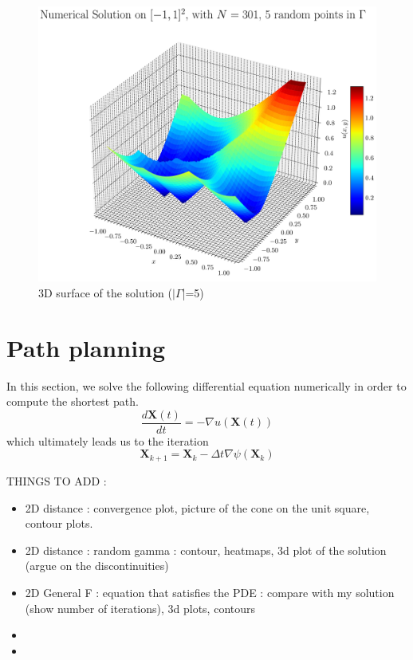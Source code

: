 \documentclass[11pt]{article}
\theoremstyle{definition}
\theoremstyle{remark}
\begin{document}
\begin{figure}[h]
\begin{minipage}{0.45\textwidth}
    \includegraphics[width=\linewidth]{plots/solution_3d_surface_random5.png}
    \caption{3D surface of the solution ($|\Gamma$|=5)}
    \label{fig:surface5}
  \end{minipage}
\end{figure}


\newpage
\newpage
\section{Path planning}
In this section, we solve the following differential equation numerically in order to compute the shortest path.
\begin{equation}
    \frac{d\textbf{X}(t)}{dt}=-\nabla u(\textbf{X}(t))
\end{equation}
which ultimately leads us to the iteration 
\begin{equation}
    \textbf{X}_{k+1}=\textbf{X}_k-\Delta t \nabla \psi(\textbf{X}_k)
\end{equation}

THINGS TO ADD :
\begin{itemize}
    \item 2D distance : convergence plot, picture of the cone on the unit square, contour plots.
    \item 2D distance : random gamma : contour, heatmaps, 3d plot of the solution (argue on the discontinuities)
    \item 2D General F : equation that satisfies the PDE : compare with my solution (show number of iterations), 3d plots, contours
    \item 
    \item 
\end{itemize}
\end{document}
